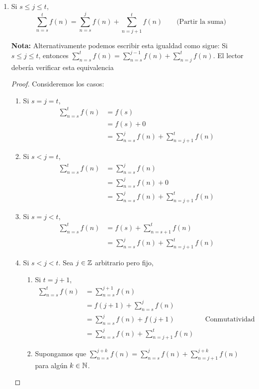 \begin{enumerate}[label=\alph*)]
  \item Si $s\leq j\leq t$, \[\sum_{n=s}^{t}f(n) = \sum_{n=s}^{j}f(n) + \sum_{n=j+1}^{t}f(n) \qquad \text{(Partir la suma)}\]
  
  \textbf{Nota:} Alternativamente podemos escribir esta igualdad como sigue: Si $s\leq j\leq t$, entonces $\sum_{n=s}^{t}f(n) = \sum_{n=s}^{j-1}f(n) + \sum_{n=j}^{t}f(n)$. El lector debería verificar esta equivalencia

  \begin{proof}
    Consideremos los casos:
    \begin{enumerate}[label=\Roman*)]
      \item Si $s=j=t$,
      \begin{align*}
        \sum_{n=s}^{t}f(n) &= f(s)\\
        &= f(s) + 0\\
        &= \sum_{n=s}^{j}f(n) + \sum_{n=j+1}^{t}f(n)
      \end{align*}
      \item Si $s<j=t$,
      \begin{align*}
        \sum_{n=s}^{t}f(n) &= \sum_{n=s}^{j}f(n)\\
        &= \sum_{n=s}^{j}f(n) + 0\\
        &= \sum_{n=s}^{j}f(n) + \sum_{n=j+1}^{t}f(n)
      \end{align*}
      \item Si $s=j<t$,
      \begin{align*}
        \sum_{n=s}^{t}f(n) &= f(s) + \sum_{n=s+1}^{t}f(n)\\
        &= \sum_{n=s}^{j}f(n) + \sum_{n=j+1}^{t}f(n)
      \end{align*}
      \item Si $s<j<t$.
        Sea $j\in \mathbb{Z}$ arbitrario pero fijo,
        \begin{enumerate}[label=\roman*)]
          \item Si $t=j+1$,
          \begin{align*}
            \sum_{n=s}^{t}f(n) &=  \sum_{n=s}^{j+1}f(n)\\
            &= f(j+1) + \sum_{n=s}^{j}f(n)\\
            &= \sum_{n=s}^{j}f(n) + f(j+1) && \text{Conmutatividad}\\
            &= \sum_{n=s}^{j}f(n) + \sum_{n=j+1}^{t}f(n)
          \end{align*}
          \item Supongamos que $\sum_{n=s}^{j+k}f(n) = \sum_{n=s}^{j}f(n) + \sum_{n=j+1}^{j+k}f(n)$ para algún $k\in \mathbb{N}$.

\end{enumerate}
\end{enumerate}
\end{proof}
\end{enumerate}
